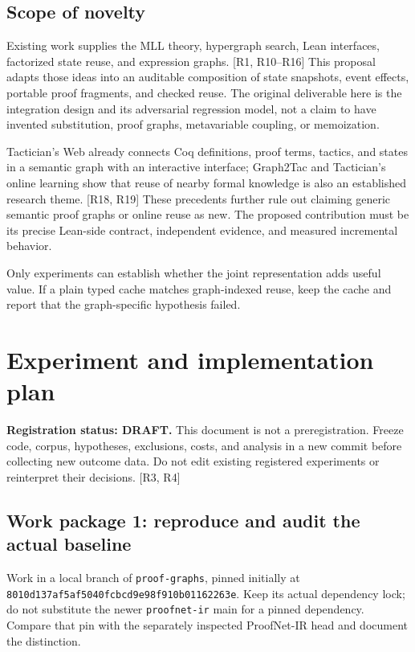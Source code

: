 \documentclass[
  10pt,
]{article}
\begin{document}
\subsection{Scope of novelty}\label{scope-of-novelty}

Existing work supplies the MLL theory, hypergraph search, Lean
interfaces, factorized state reuse, and expression graphs. {[}R1,
R10--R16{]} This proposal adapts those ideas into an auditable
composition of state snapshots, event effects, portable proof fragments,
and checked reuse. The original deliverable here is the integration
design and its adversarial regression model, not a claim to have
invented substitution, proof graphs, metavariable coupling, or
memoization.

Tactician's Web already connects Coq definitions, proof terms, tactics,
and states in a semantic graph with an interactive interface; Graph2Tac
and Tactician's online learning show that reuse of nearby formal
knowledge is also an established research theme. {[}R18, R19{]} These
precedents further rule out claiming generic semantic proof graphs or
online reuse as new. The proposed contribution must be its precise
Lean-side contract, independent evidence, and measured incremental
behavior.

Only experiments can establish whether the joint representation adds
useful value. If a plain typed cache matches graph-indexed reuse, keep
the cache and report that the graph-specific hypothesis failed.

\section{Experiment and implementation
plan}\label{experiment-and-implementation-plan}

\textbf{Registration status: DRAFT.} This document is not a
preregistration. Freeze code, corpus, hypotheses, exclusions, costs, and
analysis in a new commit before collecting new outcome data. Do not edit
existing registered experiments or reinterpret their decisions. {[}R3,
R4{]}

\subsection{Work package 1: reproduce and audit the actual
baseline}\label{work-package-1-reproduce-and-audit-the-actual-baseline}

Work in a local branch of \texttt{proof-graphs}, pinned initially at
\texttt{8010d137af5af5040fcbcd9e98f910b01162263e}. Keep its actual
dependency lock; do not substitute the newer \texttt{proofnet-ir} main
for a pinned dependency. Compare that pin with the separately inspected
ProofNet-IR head and document the distinction.
\end{document}
